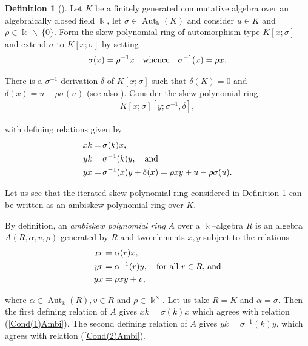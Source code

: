 \documentclass{amsart}
\theoremstyle{definition}
\newtheorem{definition}[theorem]{Definition}
\theoremstyle{remark}
\numberwithin{equation}{section}
\begin{document}
\begin{definition}[{\cite[Section 1.1]{Jordan1995}}]\label{Jordan1995Section1.1}
Let $K$ be a finitely generated commutative algebra over an algebraically closed field $\Bbbk$, let $\sigma \in \operatorname{Aut}_{\Bbbk}(K)$ and consider $u\in K$ and $\rho \in \Bbbk \ \backslash \ \{0\}$. Form the skew polynomial ring of automorphism type $K[x;\sigma]$ and extend $\sigma$ to $K[x;\sigma]$ by setting 
$$
\sigma(x) = \rho^{-1}x \quad {\rm whence} \quad \sigma^{-1}(x) = \rho x.
$$

There is a $\sigma^{-1}$-derivation $\delta$ of $K[x;\sigma]$ such that $\delta(K) = 0$ and $\delta(x) = u - \rho \sigma(u)$ \cite[p. 41]{Cohn1985} (see also \cite[Section 2.8]{GoodearlLetzter1994}). Consider the skew polynomial ring
\begin{align}\label{CertainiteratedSPR1995}
K[x;\sigma][y;\sigma^{-1},\delta], 
\end{align}

with defining relations given by 
\begin{align}
    xk = & \, \sigma(k)x, \label{Cond(1)Ambi}\\ 
    yk = & \, \sigma^{-1}(k)y, \quad {\rm and} \label{Cond(2)Ambi} \\
    yx = & \, \sigma^{-1}(x)y + \delta(x) = \rho xy + u - \rho \sigma(u). \label{Cond(3)Ambi}
\end{align}
\end{definition}

Let us see that the iterated skew polynomial ring considered in Definition \ref{Jordan1995Section1.1} can be written as an ambiskew polynomial ring over $K$.

By definition, an {\em ambiskew polynomial ring} $A$ over a $\Bbbk$–algebra $R$ is an algebra $A(R, \alpha, v, \rho)$ generated by $R$ and two elements $x, y$ subject to the relations
\begin{align}
xr &= \alpha(r)x, \\
yr &= \alpha^{-1}(r)y, \quad {\rm for\ all} \, \, r\in R, \, {\rm and} \\
yx &= \rho xy + v,
\end{align}

where $\alpha \in \operatorname{Aut}_{\Bbbk}(R),   v \in R$ and $\rho \in \Bbbk^{\times}$. Let us take $R=K$ and $\alpha=\sigma$. Then the first defining relation of $A$ gives $xk=\sigma(k)x$ which agrees with relation (\ref{Cond(1)Ambi}). The second defining relation of $A$ gives $yk=\sigma^{-1}(k)y$, which agrees with relation (\ref{Cond(2)Ambi}).
\end{document}
